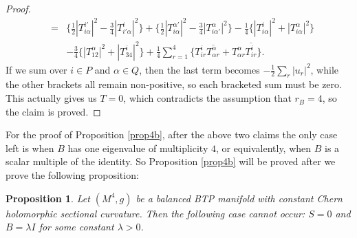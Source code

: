 \documentclass{amsart}
\newtheorem{proposition}{Proposition}
\begin{document}
\begin{proof}
\begin{eqnarray*}
 & = & \big\{ \frac{1}{2}  |T^{i'}_{i\alpha}|^2 -  \frac{3}{4} |T^i_{i'\alpha }|^2  \big\} + \big\{ \frac{1}{2}  |T^{\alpha'}_{i\alpha}|^2  -  \frac{3}{4} |T^{\alpha}_{i\alpha'}|^2 \big\} -\frac{1}{4}  \big\{ |T^i_{i\alpha}|^2 +  |T^{\alpha}_{i\alpha}|^2  \big\}\\
 & & - \frac{3}{4} \big\{ |T^{\alpha}_{12}|^2     + |T^i_{34}|^2 \big\} + \frac{1}{4} \sum_{r=1}^4 \big\{ T^i_{ir} \overline{T^{\alpha}_{\alpha r} } + T^{\alpha}_{\alpha r} \overline{T^i_{ir}} \big\}.
 \end{eqnarray*}
If we sum over $i\in P$ and $\alpha\in Q$, then the last term becomes $-\frac{1}{2}\sum_r |u_r|^2$, while the other brackets all remain non-positive, so each bracketed sum must be zero. This actually gives us $T=0$, which contradicts the assumption that $r_B=4$, so the claim is proved.
\end{proof}

For the proof of Proposition \ref{prop4b}, after the above two claims the only case left is when $B$ has one eigenvalue of multiplicity $4$, or equivalently, when $B$ is a scalar multiple of the identity. So Proposition \ref{prop4b} will be proved after we prove the following proposition:

\begin{proposition} \label{prop4c}
Let $(M^4,g)$ be a balanced BTP manifold with constant Chern holomorphic sectional curvature. Then the following case cannot occur: $S= 0$ and $B=\lambda I$ for some constant $\lambda >0$.
\end{proposition}
\end{document}
